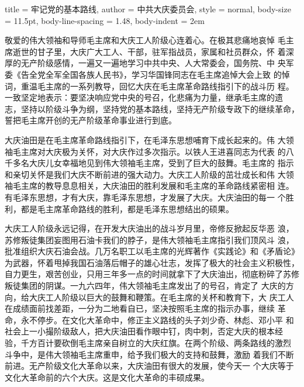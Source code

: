 \begin{hongqiarticle}{
        title  = {牢记党的基本路线},
        author = {中共大庆委员会},
        style  = normal,
        body-size = 11.5pt,
        body-line-spacing = 1.48,
        body-indent = 2em
    }
    
    敬爱的伟大领袖和导师毛主席和大庆工人阶级心连着心。在极其悲痛地哀悼
    毛主席逝世的甘子里，大庆广大工人、干部，驻军指战员，家属和社员群众，怀
    着深厚的无产阶级感情，一遍又一遍地学习中共中央、人大常委会，国务院、中
    央军委《告全党全军全国各族人民书》，学习华国锋同志在毛主席追悼大会上致
    的悼词，重温毛主席的一系列教导，回忆大庆在毛主席革命路线指引下的战斗历
    程。一致坚定地表示：要坚决响应党中央的号召，化悲痛为力量，继承毛主席的遗
    志，坚持以阶级斗争为纲，坚持党的基本路线，坚持无产阶级专政下的继续革命，
    誓把毛主席开创的无产阶级革命事业进行到底。
    
    大庆油田是在毛主席革命路线指引下，在毛泽东思想哺育下成长起来的。伟
    大领袖毛主席对大庆极为关怀，对大庆作过多次指示。以铁人王进喜同志为代表
    的八千多名大庆儿女幸福地见到伟大领袖毛主席，受到了巨大的鼓舞。毛主席的
    指示和亲切关怀是我们大庆不断前进的强大动力。大庆工人阶级的茁壮成长和伟
    大领袖毛主席的教导息息相关，大庆油田的胜利发展和毛主席的革命路线紧密相
    连。有毛泽东思想，才有大庆，靠毛泽东思想，才发展了大庆。大庆油田的每一
    个胜利，都是毛主席革命路线的胜利，都是毛泽东思想结出的硕果。
    
    大庆工人阶级永远记得，在开发大庆油出的战斗岁月里，帝修反掀起反华恶
    浪，苏修叛徒集团妄图用石油卡我们的脖子，是伟大领袖毛主席指引我们顶风斗
    浪，批准组织大庆石油会战。几万名职工以毛主席的光辉著作《实践论》和《矛盾论》
    为武器，怀着甩掉我国石油落后帽子的雄心壮志，发挥了极大的社会主义积极性，
    自力更生，艰苦创业，只用三年多一点的时间就拿下了大庆油出，彻底粉碎了苏修
    叛徒集团的阴谋。一九六四年，伟大领袖毛主席发出了的号召，肯定了
    大庆的方向，给大庆工人阶级以巨大的鼓舞和鞭策。在毛主席的关杯和教育下，大
    庆工人在成绩面前找差距，一分为二地看自已，坚决按照毛主席的指示办事，继续
    革命，永不停步。在文化大革命中，修正主义路线的头子刘少奇、林彪、邓小平
    和社会上一小撮阶级敌人，把大庆油田看作眼中钉，肉中刺，否定大庆的根本经
    验，千方百计要砍倒毛主席亲自树立的大庆红旗。在两个阶级、两条路线的激烈
    斗争中，是伟大领袖毛主席重申，给予我们极大的支持和鼓舞，激励
    着我们不断前进。无产阶级文化大革命以来，大庆油田有很大的发展，使今天一
    个大庆等于文化大革命前的六个大庆。这是文化大革命的丰硕成果。
    

\end{hongqiarticle}
